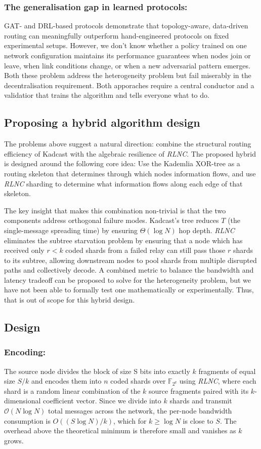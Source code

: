 \documentclass{article}
\begin{document}
\subsubsection*{The generalisation gap in learned protocols:} GAT- and DRL-based protocols demonstrate that topology-aware, data-driven routing can meaningfully outperform hand-engineered protocols on fixed experimental setups. However, we don't know whether a policy trained on one network configuration maintains its performance guarantees when nodes join or leave, when link conditions change, or when a new adversarial pattern emerges. Both these problem address the heterogeneity problem but fail miserably in the decentralisation requirement. Both apporaches require a central conductor and a validatior that trains the algorithm and tells everyone what to do.


\subsection{Proposing a hybrid algorithm design}
The problems above suggest a natural direction: combine the structural routing efficiency of Kadcast with the algebraic resilience of \textit{RLNC}. The proposed hybrid is designed around the following core idea: Use the Kademlia XOR-tree as a routing skeleton that determines through which nodes information flows, and use \textit{RLNC} sharding to determine what information flows along each edge of that skeleton.

The key insight that makes this combination non-trivial is that the two components address orthogonal failure modes. Kadcast's tree reduces $T$ (the single-message spreading time) by ensuring $\Theta{(\log N)}$ hop depth. \textit{RLNC} eliminates the subtree starvation problem by ensuring that a node which has received only $r < k$ coded shards from a failed relay can still pass those $r$ shards to its subtree, allowing downstream nodes to pool shards from multiple disrupted paths and collectively decode.
A combined metric to balance the bandwidth and latency tradeoff can be proposed to solve for the heterogeneity problem, but we have not been able to formally test one mathematically or experimentally. Thus, that is out of scope for this hybrid design.


\subsection{Design}
\subsubsection*{Encoding:} The source node divides the block of size S bits into exactly $k$ fragments of equal size $S/k$ and encodes them into $n$ coded shards over $\mathbb{F}_{2^q}$ using \textit{RLNC}, where each shard is a random linear combination of the $k$ source fragments paired with its $k$-dimensional coefficient vector. Since we divide into $k$ shards and transmit $\mathcal{O}{(N \log N)}$ total messages across the network, the per-node bandwidth consumption is $O((S \log N )/ k)$, which for $k \geq \log N$ is close to $S$. The overhead above the theoretical minimum is therefore small and vanishes as $k$ grows.
\end{document}

